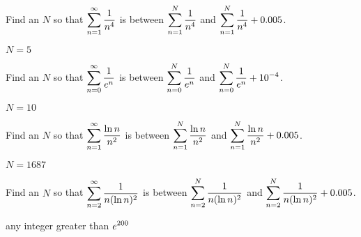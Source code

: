 \begin{exercises}
\endtwocol

\msk
\begin{exercise} Find an $N$ so that
$\displaystyle\sum_{n=1}^\infty {1\over n^4}$ is between
$\displaystyle\sum_{n=1}^N {1\over n^4}$ and
$\displaystyle\sum_{n=1}^N {1\over n^4} + 0.005$.
\begin{answer} $N=5$
\end{answer}\end{exercise}

\begin{exercise} Find an $N$ so that
$\displaystyle\sum_{n=0}^\infty {1\over e^n}$ is between
$\displaystyle\sum_{n=0}^N {1\over e^n}$ and
$\displaystyle\sum_{n=0}^N {1\over e^n} + 10^{-4}$.
\begin{answer} $N=10$
\end{answer}\end{exercise}

\begin{exercise} Find an $N$ so that
$\displaystyle\sum_{n=1}^\infty {\ln n\over n^2}$ is between
$\displaystyle\sum_{n=1}^N {\ln n\over n^2}$ and
$\displaystyle\sum_{n=1}^N {\ln n\over n^2} + 0.005$.
\begin{answer} $N=1687$
\end{answer}\end{exercise}

\begin{exercise} Find an $N$ so that
$\displaystyle\sum_{n=2}^\infty {1\over n(\ln n)^2}$ is between
$\displaystyle\sum_{n=2}^N {1\over n(\ln n)^2}$ and
$\displaystyle\sum_{n=2}^N {1\over n(\ln n)^2} + 0.005$.
\begin{answer} any integer greater than $\displaystyle e^{200}$
\end{answer}\end{exercise}

\end{exercises}

